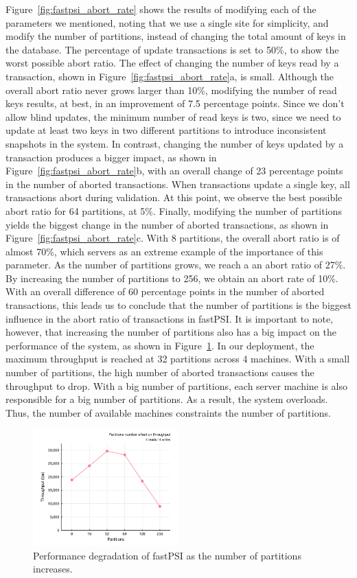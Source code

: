 Figure~\ref{fig:fastpsi_abort_rate} shows the results of modifying each of the parameters we mentioned, noting that we use a single site for simplicity, and modify the number of partitions, instead of changing the total amount of keys in the database. The percentage of update transactions is set to 50\%, to show the worst possible abort ratio. The effect of changing the number of keys read by a transaction, shown in Figure~\ref{fig:fastpsi_abort_rate}a, is small. Although the overall abort ratio never grows larger than 10\%, modifying the number of read keys results, at best, in an improvement of 7.5 percentage points. Since we don't allow blind updates, the minimum number of read keys is two, since we need to update at least two keys in two different partitions to introduce inconsistent snapshots in the system. In contrast, changing the number of keys updated by a transaction produces a bigger impact, as shown in Figure~\ref{fig:fastpsi_abort_rate}b, with an overall change of 23 percentage points in the number of aborted transactions. When transactions update a single key, all transactions abort during validation. At this point, we observe the best possible abort ratio for 64 partitions, at 5\%. Finally, modifying the number of partitions yields the biggest change in the number of aborted transactions, as shown in Figure~\ref{fig:fastpsi_abort_rate}c. With 8 partitions, the overall abort ratio is of almost 70\%, which servers as an extreme example of the importance of this parameter. As the number of partitions grows, we reach a an abort ratio of 27\%. By increasing the number of partitions to 256, we obtain an abort rate of 10\%. With an overall difference of 60 percentage points in the number of aborted transactions, this leads us to conclude that the number of partitions is the biggest influence in the abort ratio of transactions in fastPSI. It is important to note, however, that increasing the number of partitions also has a big impact on the performance of the system, as shown in Figure~\ref{fig:fastpsi_partition_throughput}. In our deployment, the maximum throughput is reached at 32 partitions across 4 machines. With a small number of partitions, the high number of aborted transactions causes the throughput to drop. With a big number of partitions, each server machine is also responsible for a big number of partitions. As a result, the system overloads. Thus, the number of available machines constraints the number of partitions.

\begin{figure}[t]
\begin{center}
\includegraphics[width=0.5\textwidth]{figures/psi_partitions_throughput.pdf}
\vspace{-0.75cm}
\end{center}
\caption{Performance degradation of fastPSI as the number of partitions increases.}
\label{fig:fastpsi_partition_throughput}
\end{figure}
